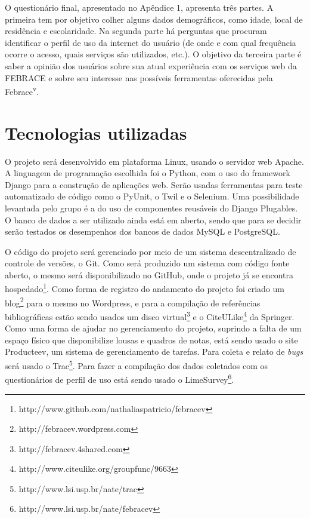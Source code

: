     O questionário final, apresentado no Apêndice 1, apresenta três partes. A primeira tem por objetivo colher alguns dados demográficos, como idade, local de residência e escolaridade. Na segunda parte há perguntas que procuram identificar o perfil de uso da internet do usuário (de onde e com qual frequência ocorre o acesso, quais serviços são utilizados, etc.). O objetivo da terceira parte é saber a opinião dos usuários sobre sua atual experiência com os serviços web da FEBRACE e sobre seu interesse nas possíveis ferramentas oferecidas pela Febrace\textsuperscript{v}.

\section{Tecnologias utilizadas}\label{tecnologias}

  O projeto será desenvolvido em plataforma Linux, usando o servidor web Apache. A linguagem de programação escolhida foi o Python, com o uso do framework Django para a construção de aplicações web. Serão usadas ferramentas para teste automatizado de código como o PyUnit, o Twil e o Selenium. Uma possibilidade levantada pelo grupo é a do uso de componentes reusáveis do Django Plugables. O banco de dados a ser utilizado ainda está em aberto, sendo que para se decidir serão testados os desempenhos dos bancos de dados MySQL e PostgreSQL.

  O código do projeto será gerenciado por meio de um sistema descentralizado de controle de versões, o Git. Como será produzido um sistema com código fonte aberto, o mesmo será disponibilizado no GitHub, onde o projeto já se encontra hospedado\footnote{http://www.github.com/nathaliaspatricio/febracev}. Como forma de registro do andamento do projeto foi criado um blog\footnote{http://febracev.wordpress.com} para o mesmo no Wordpress, e para a compilação de referências bibliográficas estão sendo usados um disco virtual\footnote{http://febracev.4shared.com} e o CiteULike\footnote{http://www.citeulike.org/groupfunc/9663} da Springer. Como uma forma de ajudar no gerenciamento do projeto, suprindo a falta de um espaço físico que disponibilize lousas e quadros de notas, está sendo usado o site Producteev, um sistema de gerenciamento de tarefas. Para coleta e relato de \textit{bugs} será usado o Trac\footnote{http://www.lsi.usp.br/nate/trac}. Para fazer a compilação dos dados coletados com os questionários de perfil de uso está sendo usado o LimeSurvey\footnote{http://www.lsi.usp.br/nate/febracev}.

